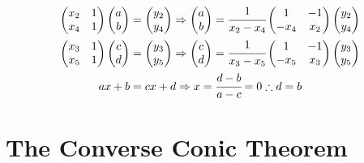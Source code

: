 \documentclass[12pt]{article}
\numberwithin{table}{section}
\begin{document}
\begin{align}
    \begin{pmatrix}
        x_2 & 1 \\ x_4 & 1
    \end{pmatrix}  
    \begin{pmatrix}
        a \\ b
    \end{pmatrix} &=
    \begin{pmatrix}
        y_2 \\ y_4
    \end{pmatrix} \Rightarrow 
    \begin{pmatrix}
        a \\ b
    \end{pmatrix} = \cfrac{1}{x_2 - x_4}
    \begin{pmatrix}
        1 & -1 \\ -x_4 & x_2
    \end{pmatrix}  
    \begin{pmatrix}
        y_2 \\ y_4
    \end{pmatrix} \\
    \begin{pmatrix}
        x_3 & 1 \\ x_5 & 1
    \end{pmatrix}  
    \begin{pmatrix}
        c \\ d
    \end{pmatrix} &=
    \begin{pmatrix}
        y_3 \\ y_5
    \end{pmatrix} \Rightarrow 
    \begin{pmatrix}
        c \\ d
    \end{pmatrix} = \cfrac{1}{x_3 - x_5}
    \begin{pmatrix}
        1 & -1 \\ -x_5 & x_3
    \end{pmatrix}  
    \begin{pmatrix}
        y_3 \\ y_5
    \end{pmatrix} \\
    ax + b &= cx + d \Rightarrow x = \cfrac{d-b}{a-c} = 0 \therefore d = b
\end{align}

\newpage

\section{The Converse Conic Theorem}
\end{document}
